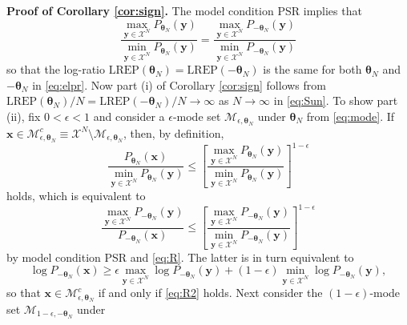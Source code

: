 \documentclass[numbib]{imamat}
\theoremstyle{theorem}
\theoremstyle{lemma}
\theoremstyle{example}
\theoremstyle{corollary}
\theoremstyle{definition}
\theoremstyle{remark}
\theoremstyle{approximation}
\theoremstyle{scheme}
\newcommand{\REP}{\mathrm{LREP}}
\begin{document}
\textbf{Proof of Corollary \ref{cor:sign}.} The model condition PSR
implies that \begin{equation}
\label{eq:R}
\frac{\max_{\boldsymbol y \in \mathcal{X}^N}P_{\boldsymbol \theta_N}(\boldsymbol y)  }{\min_{\boldsymbol y \in \mathcal{X}^N}P_{\boldsymbol \theta_N}(\boldsymbol y) } = \frac{\max_{\boldsymbol y \in \mathcal{X}^N}P_{-\boldsymbol \theta_N}(\boldsymbol y) }{\min_{\boldsymbol y \in \mathcal{X}^N}P_{-\boldsymbol \theta_N}(\boldsymbol y) }
\end{equation} so that the log-ratio
\(\REP(\boldsymbol \theta_N)=\REP(-\boldsymbol \theta_N)\) is the same
for both \(\boldsymbol \theta_N\) and \(-\boldsymbol \theta_N\) in
\eqref{eq:elpr}. Now part (i) of Corollary \ref{cor:sign} follows from
\(\REP(\boldsymbol \theta_N)/N=\REP(-\boldsymbol \theta_N)/N\to \infty\)
as \(N\to \infty\) in \eqref{eq:Sun}. To show part (ii), fix
\(0 < \epsilon < 1\) and consider a \(\epsilon\)-mode set
\(\mathcal{M}_{\epsilon, \boldsymbol \theta_N}\) under
\(\boldsymbol \theta_N\) from \eqref{eq:mode}. If
\(\boldsymbol x \in \mathcal{M}_{\epsilon, \boldsymbol \theta_N}^c \equiv \mathcal{X}^N \setminus \mathcal{M}_{\epsilon, \boldsymbol \theta_N}\),
then, by definition, \[
\frac{P_{\boldsymbol \theta_N}(\boldsymbol x)}{\min_{\boldsymbol y \in \mathcal{X}^N}P_{\boldsymbol \theta_N}(\boldsymbol y)} \leq \left[\frac{\max_{\boldsymbol y \in \mathcal{X}^N}P_{\boldsymbol \theta_N}(\boldsymbol y)  }{\min_{\boldsymbol y \in \mathcal{X}^N}P_{\boldsymbol \theta_N}(\boldsymbol y) } \right]^{1-\epsilon}
\] holds, which is equivalent to \[
\frac{\max_{\boldsymbol y \in \mathcal{X}^N}P_{-\boldsymbol \theta_N}(\boldsymbol y)}{P_{-\boldsymbol \theta_N}(\boldsymbol x)} \leq
\left[\frac{\max_{\boldsymbol y \in \mathcal{X}^N}P_{-\boldsymbol \theta_N}(\boldsymbol y)  }{\min_{\boldsymbol y \in \mathcal{X}^N}P_{-\boldsymbol \theta_N}(\boldsymbol y) } \right]^{1-\epsilon}
\] by model condition PSR and \eqref{eq:R}. The latter is in turn
equivalent to \begin{equation}
\label{eq:R2}
\log P_{-\boldsymbol \theta_N}(\boldsymbol x) \geq \epsilon \max\limits_{\boldsymbol y \in \mathcal{X}^N} \log  P_{-\boldsymbol \theta_N}(\boldsymbol y) + (1-\epsilon)\min\limits_{\boldsymbol y \in \mathcal{X}^N} \log P_{-\boldsymbol \theta_N}(\boldsymbol y),
\end{equation} so that
\(\boldsymbol x \in \mathcal{M}_{\epsilon, \boldsymbol \theta_N}^c\) if
and only if \eqref{eq:R2} holds. Next consider the \((1-\epsilon)\)-mode
set \(\mathcal{M}_{1-\epsilon, -\boldsymbol \theta_N}\) under
\end{document}
